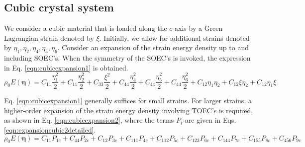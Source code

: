 \documentclass[showpacs,aps,floatfix,prb,reprint,superscriptaddress,onecolumn]{revtex4-1}
\begin{document}



\subsection{Cubic crystal system}
We consider a cubic material that is loaded along the $c$-axis by a Green Lagrangian strain denoted by $\xi$. Initially, we allow for additional strains denoted by $\eta_1, \eta_2, \eta_4, \eta_5, \eta_6$. Consider an expansion of the strain energy density up to and including SOEC's. When the symmetry of the SOEC's is invoked, the expression in Eq. \ref{eqn:cubicexpansion1} is obtained.
\begin{equation}
\label{eqn:cubicexpansion1} 
\rho_{0} E \left(\bm{\eta}\right) = C_{11}\frac{\eta_{1}^2}{2} + C_{11}\frac{\eta_{2}^2}{2} +  C_{33}\frac{\xi^2}{2} + C_{44}\frac{\eta_{4}^2}{2} + C_{44}\frac{\eta_{5}^2}{2} + C_{44}\frac{\eta_{6}^2}{2} + C_{12}\eta_{1}\eta_{2} + C_{12}\xi\eta_{2} + C_{12}\eta_{1}\xi
\end{equation}

Eq. \ref{eqn:cubicexpansion1} generally suffices for small strains. For larger strains, a higher-order expansion of the strain energy density involving TOEC's is required, as shown in Eq. \ref{eqn:cubicexpansion2}, where the terms $P_{i}$ are given in Eqs. \ref{eqn:expansioncubic2detailed}.  
\begin{equation}
\label{eqn:cubicexpansion2} 
\rho_{0} E \left(\bm{\eta}\right) = C_{11}P_{1c} + C_{44}P_{2c} + C_{12}P_{3c} +  C_{111}P_{4c} + C_{112}P_{5c} + C_{123}P_{6c} + C_{144}P_{7c} + C_{155}P_{8c} + C_{456}P_{9c}
\end{equation}
\end{document}
